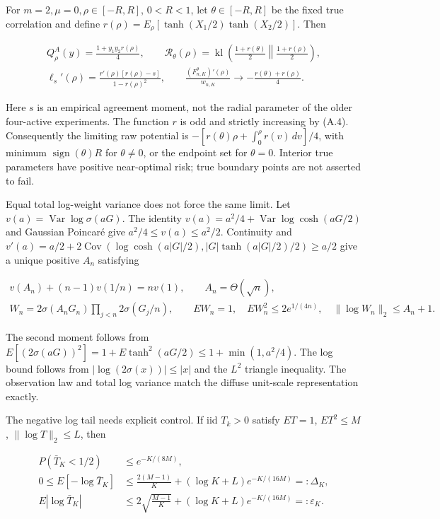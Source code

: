 \documentclass{article}
\begin{document}
For \(m=2,\mu=0,\rho\in[-R,R]\), \(0<R<1\), let \(\theta\in[-R,R]\) be
the fixed true correlation and define
\(r(\rho)=E_\rho[\tanh(X_1/2)\tanh(X_2/2)]\). Then

\[
\begin{gathered}
Q_\rho^A(y)=\frac{1+y_1y_2r(\rho)}4,\qquad
\mathcal R_\theta(\rho)=\operatorname{kl}\!\left(
\frac{1+r(\theta)}2\middle\Vert\frac{1+r(\rho)}2\right),\\
\ell_s'(\rho)=\frac{r'(\rho)[r(\rho)-s]}{1-r(\rho)^2},\qquad
\frac{(F_{n,K}^\theta)'(\rho)}{w_{n,K}}\to-\frac{r(\theta)+r(\rho)}4 .
\end{gathered}
\tag{A.24}
\]

Here \(s\) is an empirical agreement moment, not the radial parameter of
the older four-active experiments. The function \(r\) is odd and
strictly increasing by (A.4). Consequently the limiting raw potential is
\(-[r(\theta)\rho+\int_0^\rho r(v)\,dv]/4\), with minimum
\(\operatorname{sign}(\theta)R\) for \(\theta\ne0\), or the endpoint set
for \(\theta=0\). Interior true parameters have positive near-optimal
risk; true boundary points are not asserted to fail.

Equal total log-weight variance does not force the same limit. Let
\(v(a)=\operatorname{Var}\log\sigma(aG)\). The identity
\(v(a)=a^2/4+\operatorname{Var}\log\cosh(aG/2)\) and Gaussian Poincaré
give \(a^2/4\le v(a)\le a^2/2\). Continuity and
\(v'(a)=a/2+2\operatorname{Cov}(\log\cosh(a|G|/2),|G|\tanh(a|G|/2)/2)\ge a/2\)
give a unique positive \(A_n\) satisfying

\[
\begin{gathered}
v(A_n)+(n-1)v(1/n)=nv(1),\qquad A_n=\Theta(\sqrt n),\\
W_n=2\sigma(A_nG_n)\prod_{j<n}2\sigma(G_j/n),\qquad
EW_n=1,\quad EW_n^2\le2e^{1/(4n)},\quad
\|\log W_n\|_2\le A_n+1 .
\end{gathered}
\tag{A.25}
\]

The second moment follows from
\(E[(2\sigma(aG))^2]=1+E\tanh^2(aG/2)\le1+\min(1,a^2/4)\). The log bound
follows from \(|\log(2\sigma(x))|\le|x|\) and the \(L^2\) triangle
inequality. The observation law and total log variance match the diffuse
unit-scale representation exactly.

The negative log tail needs explicit control. If iid \(T_k>0\) satisfy
\(ET=1\), \(ET^2\le M\), \(\|\log T\|_2\le L\), then

\[
\begin{aligned}
P(\bar T_K<1/2)&\le e^{-K/(8M)},\\
0\le E[-\log\bar T_K]&\le
\frac{2(M-1)}K+(\log K+L)e^{-K/(16M)}=:\Delta_K,\\
E|\log\bar T_K|&\le
2\sqrt{\frac{M-1}K}+(\log K+L)e^{-K/(16M)}=:\varepsilon_K .
\end{aligned}
\tag{A.26}
\]
\end{document}
